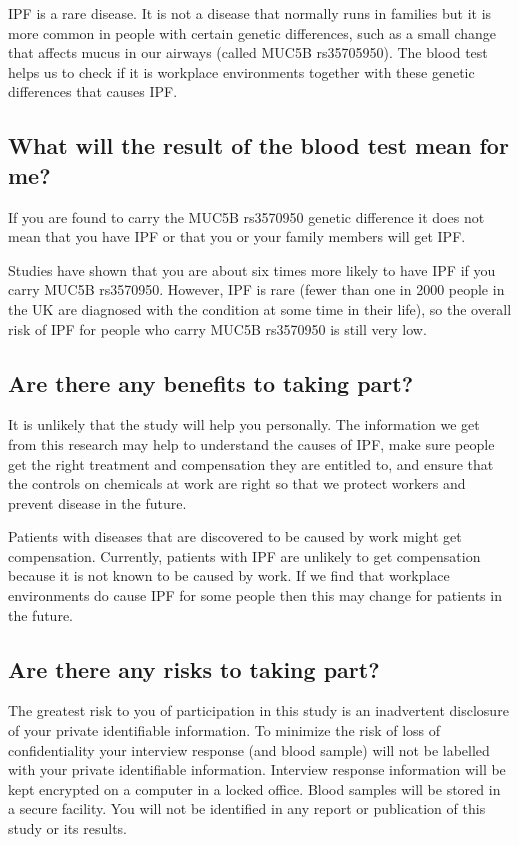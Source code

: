 \documentclass[a4paper,10pt]{article}
\begin{document}
IPF is a rare disease. It is not a disease that normally runs in families but it is more common in people with certain genetic differences, such as a small change that affects mucus in our airways (called MUC5B rs35705950). The blood test helps us to check if it is workplace environments together with these genetic differences that causes IPF.   

\subsection*{What will the result of the blood test mean for me?}

If you are found to carry the MUC5B rs3570950 genetic difference it does not mean that you have IPF or that you or your family members will get IPF. 

Studies have shown that you are about six times more likely to have IPF if you carry MUC5B rs3570950. However, IPF is rare (fewer than one in 2000 people in the UK are diagnosed with the condition at some time in their life), so the overall risk of IPF for people who carry MUC5B rs3570950 is still very low.    

\subsection*{Are there any benefits to taking part?}

It is unlikely that the study will help you personally. The information we get from this research may help to understand the causes of IPF, make sure people get the right treatment and compensation they are entitled to, and ensure that the controls on chemicals at work are right so that we protect workers and prevent disease in the future.

Patients with diseases that are discovered to be caused by work might get compensation. Currently, patients with IPF are unlikely to get compensation because it is not known to be caused by work. If we find that workplace environments do cause IPF for some people then this may change for patients in the future.   

\subsection*{Are there any risks to taking part?}

The greatest risk to you of participation in this study is an inadvertent disclosure of your private identifiable information. To minimize the risk of loss of confidentiality your interview response (and blood sample) will not be labelled with your private identifiable information. Interview response information will be kept encrypted on a computer in a locked office. Blood samples will be stored in a secure facility. You will not be identified in any report or publication of this study or its results.
\end{document}
